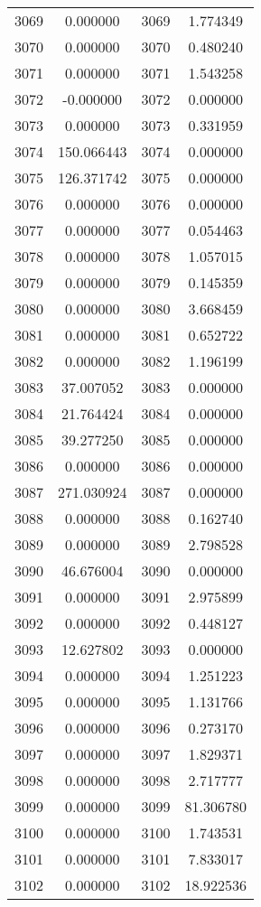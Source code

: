\documentclass[12pt]{article}
\begin{document}
\begin{longtable}{@{}cccc@{}}
3069 & 0.000000 & 3069 & 1.774349 \\
3070 & 0.000000 & 3070 & 0.480240 \\
3071 & 0.000000 & 3071 & 1.543258 \\
3072 & -0.000000 & 3072 & 0.000000 \\
3073 & 0.000000 & 3073 & 0.331959 \\
3074 & 150.066443 & 3074 & 0.000000 \\
3075 & 126.371742 & 3075 & 0.000000 \\
3076 & 0.000000 & 3076 & 0.000000 \\
3077 & 0.000000 & 3077 & 0.054463 \\
3078 & 0.000000 & 3078 & 1.057015 \\
3079 & 0.000000 & 3079 & 0.145359 \\
3080 & 0.000000 & 3080 & 3.668459 \\
3081 & 0.000000 & 3081 & 0.652722 \\
3082 & 0.000000 & 3082 & 1.196199 \\
3083 & 37.007052 & 3083 & 0.000000 \\
3084 & 21.764424 & 3084 & 0.000000 \\
3085 & 39.277250 & 3085 & 0.000000 \\
3086 & 0.000000 & 3086 & 0.000000 \\
3087 & 271.030924 & 3087 & 0.000000 \\
3088 & 0.000000 & 3088 & 0.162740 \\
3089 & 0.000000 & 3089 & 2.798528 \\
3090 & 46.676004 & 3090 & 0.000000 \\
3091 & 0.000000 & 3091 & 2.975899 \\
3092 & 0.000000 & 3092 & 0.448127 \\
3093 & 12.627802 & 3093 & 0.000000 \\
3094 & 0.000000 & 3094 & 1.251223 \\
3095 & 0.000000 & 3095 & 1.131766 \\
3096 & 0.000000 & 3096 & 0.273170 \\
3097 & 0.000000 & 3097 & 1.829371 \\
3098 & 0.000000 & 3098 & 2.717777 \\
3099 & 0.000000 & 3099 & 81.306780 \\
3100 & 0.000000 & 3100 & 1.743531 \\
3101 & 0.000000 & 3101 & 7.833017 \\
3102 & 0.000000 & 3102 & 18.922536 \\

\end{longtable}
\end{document}
